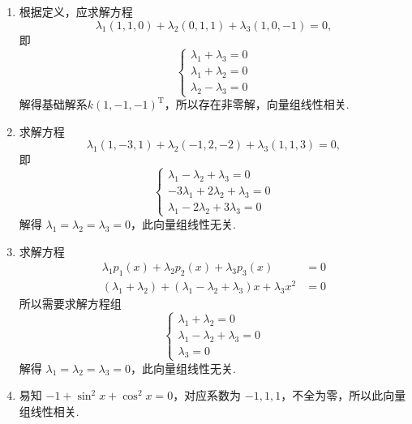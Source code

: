\begin{solution}
    \begin{enumerate}
        \item 根据定义，应求解方程
              \[\lambda_1(1,1,0) + \lambda_2(0,1,1) + \lambda_3(1,0,-1) = 0,\]
              即
              \[ \begin{cases}
                      \lambda_1 + \lambda_3 = 0 \\
                      \lambda_1 + \lambda_2 = 0 \\
                      \lambda_2 - \lambda_3 = 0
                  \end{cases} \]
              解得基础解系$k(1,-1,-1)^\mathrm{T}$，所以存在非零解，向量组线性相关.

        \item 求解方程
              \[\lambda_1(1,-3,1) + \lambda_2(-1,2,-2) + \lambda_3(1,1,3) = 0,\]
              即
              \[ \begin{cases}
                      \lambda_1 - \lambda_2 + \lambda_3 = 0    \\
                      -3\lambda_1 + 2\lambda_2 + \lambda_3 = 0 \\
                      \lambda_1 - 2\lambda_2 + 3\lambda_3 = 0
                  \end{cases} \]
              解得 $\lambda_1 = \lambda_2 = \lambda_3 = 0$，此向量组线性无关.

        \item 求解方程
              \begin{align*}
                  \lambda_1p_1(x) + \lambda_2p_2(x) + \lambda_3p_3(x)                           & = 0 \\
                  (\lambda_1 + \lambda_2) + (\lambda_1 - \lambda_2 + \lambda_3)x + \lambda_3x^2 & = 0
              \end{align*}
              所以需要求解方程组
              \[ \begin{cases}
                      \lambda_1 + \lambda_2 = 0             \\
                      \lambda_1 - \lambda_2 + \lambda_3 = 0 \\
                      \lambda_3 = 0
                  \end{cases} \]
              解得 $\lambda_1 = \lambda_2 = \lambda_3 = 0$，此向量组线性无关.

        \item 易知 $-1 + \sin^2x + \cos^2x = 0$，对应系数为 $-1, 1, 1$，不全为零，所以此向量组线性相关.


\end{enumerate}
\end{solution}
